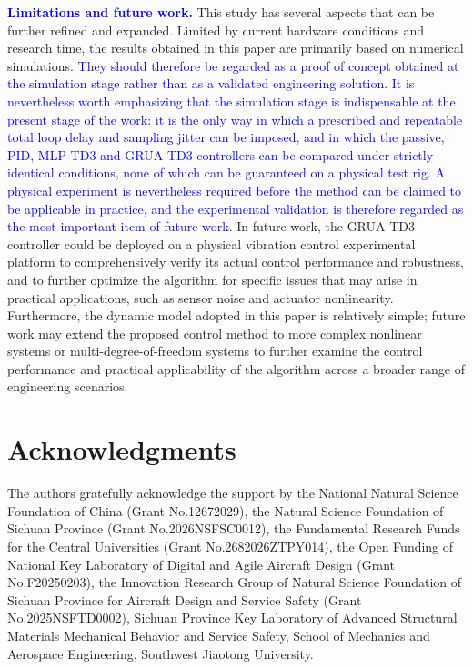 \documentclass[review]{elsarticle}
\begin{document}
\textcolor{blue}{\textbf{Limitations and future work.}} This study has several aspects that can be further refined and expanded.
Limited by current hardware conditions and research time, the results obtained in this paper are primarily based on numerical simulations. \textcolor{blue}{They should therefore be regarded as a proof of concept obtained at the simulation stage rather than as a validated engineering solution. It is nevertheless worth emphasizing that the simulation stage is indispensable at the present stage of the work: it is the only way in which a prescribed and repeatable total loop delay and sampling jitter can be imposed, and in which the passive, PID, MLP-TD3 and GRUA-TD3 controllers can be compared under strictly identical conditions, none of which can be guaranteed on a physical test rig. A physical experiment is nevertheless required before the method can be claimed to be applicable in practice, and the experimental validation is therefore regarded as the most important item of future work.}
In future work, the GRUA-TD3 controller could be deployed on a physical vibration control experimental platform to comprehensively verify its actual control performance and robustness, and to further optimize the algorithm for specific issues that may arise in practical applications, such as sensor noise and actuator nonlinearity.
Furthermore, the dynamic model adopted in this paper is relatively simple; future work may extend the proposed control method to more complex nonlinear systems or multi-degree-of-freedom systems to further examine the control performance and practical applicability of the algorithm across a broader range of engineering scenarios.

\section*{Acknowledgments}
The authors gratefully acknowledge the support by the National Natural Science Foundation of China (Grant No.12672029), the Natural Science Foundation of Sichuan Province (Grant No.2026NSFSC0012), the Fundamental Research Funds for the Central Universities (Grant No.2682026ZTPY014), the Open Funding of National Key Laboratory of Digital and Agile Aircraft Design (Grant No.F20250203), the Innovation Research Group of Natural Science Foundation of Sichuan Province for Aircraft Design and Service Safety (Grant No.2025NSFTD0002), Sichuan Province Key Laboratory of Advanced Structural Materials Mechanical Behavior and Service Safety, School of Mechanics and Aerospace Engineering, Southwest Jiaotong University.
\end{document}
